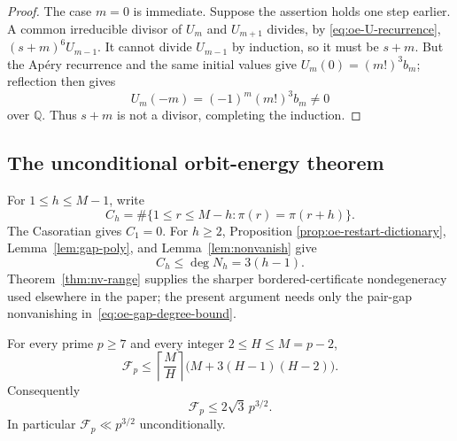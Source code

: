 \begin{proof}
The case $m=0$ is immediate.  Suppose the assertion holds one step earlier.
A common irreducible divisor of $U_m$ and $U_{m+1}$ divides, by
\eqref{eq:oe-U-recurrence}, $(s+m)^6U_{m-1}$.  It cannot divide $U_{m-1}$
by induction, so it must be $s+m$.  But the Ap\'ery recurrence and the same
initial values give $U_m(0)=(m!)^3b_m$; reflection then gives
\[
 U_m(-m)=(-1)^m(m!)^3b_m\ne0
\]
over $\mathbb Q$.  Thus $s+m$ is not a divisor, completing the induction.
\end{proof}

\subsection{The unconditional orbit-energy theorem}

For $1\le h\le M-1$, write
\[
 C_h=\#\{1\le r\le M-h:\pi(r)=\pi(r+h)\}.
\]
The Casoratian gives $C_1=0$.  For $h\ge2$, Proposition
\ref{prop:oe-restart-dictionary}, Lemma~\ref{lem:gap-poly}, and
Lemma~\ref{lem:nonvanish} give
\begin{equation}\label{eq:oe-gap-degree-bound}
 C_h\le\deg N_h=3(h-1).
\end{equation}
Theorem~\ref{thm:nv-range} supplies the sharper bordered-certificate
nondegeneracy used elsewhere in the paper; the present argument needs only
the pair-gap nonvanishing in~\eqref{eq:oe-gap-degree-bound}.

\begin{theorem}
\label{thm:oe-energy-three-halves}
For every prime $p\ge7$ and every integer $2\le H\le M=p-2$,
\begin{equation}\label{eq:oe-block-bound}
 \mathcal F_p\le
 \left\lceil\frac MH\right\rceil
 \bigl(M+3(H-1)(H-2)\bigr).
\end{equation}
Consequently
\begin{equation}\label{eq:oe-three-halves}
 \boxed{\mathcal F_p\le2\sqrt3\,p^{3/2}.}
\end{equation}
In particular $\mathcal F_p\ll p^{3/2}$ unconditionally.
\end{theorem}


